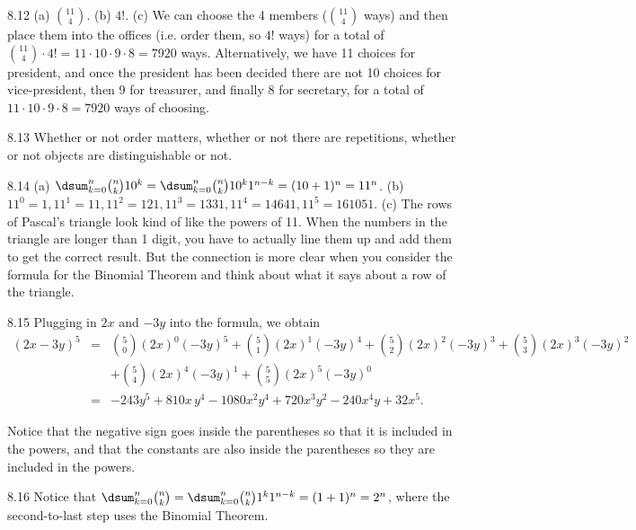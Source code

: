 \begin{RequAnswer}{8.12}
(a) $\binom{11}{4}$.
(b) $4!$.
(c) We can choose the 4 members ($\binom{11}{4}$ ways) and then place them into the offices (i.e. order them, so $4!$ ways)
for a total of $\binom{11}{4}\cdot 4! = 11\cdot 10\cdot 9 \cdot 8 = 7920$ ways.
Alternatively, we have 11 choices for president, and once the president has been decided there are not 10 choices for
vice-president, then 9 for treasurer, and finally 8 for secretary, for a total of  $11\cdot 10\cdot 9 \cdot 8 = 7920$ ways
of choosing.
\end{RequAnswer}
\begin{RequAnswer}{8.13}
Whether or not order matters, whether or not there are repetitions, whether or not objects are distinguishable or not.
\end{RequAnswer}
\begin{RequAnswer}{8.14}
(a) $\dsum_{k=0}^{n} \binom{n}{k}10^{k}= \dsum_{k=0}^{n} \binom{n}{k}10^{k}1^{n-k} = (10+1)^n=11^n$.
(b) $11^0=1, 11^1=11, 11^2=121, 11^3=1331, 11^4=14641, 11^5=161051$.
(c) The rows of Pascal's triangle look kind of like the powers of 11. When the numbers in the triangle are longer than 1 digit,
you have to actually line them up and add them to get the correct result. But the connection is more clear when you
consider the formula for the Binomial Theorem and think about what it says about a row of the triangle.
\end{RequAnswer}
\begin{RequAnswer}{8.15}
Plugging in $2x$ and $-3y$ into the formula, we obtain
\begin{eqnarray*}
(2x-3y)^5 &=&
\binom{5}{0}(2x)^0(-3y)^5+
\binom{5}{1}(2x)^1(-3y)^4+
\binom{5}{2}(2x)^2(-3y)^3+
\binom{5}{3}(2x)^3(-3y)^2\\
&&+\binom{5}{4}(2x)^4(-3y)^1+\binom{5}{5}(2x)^5(-3y)^0\\
&=& -243y^5 + 810x\, y^4 - 1080x^2y^4+720x^3y^2-  240 x^4y+32x^5.
\end{eqnarray*}

\noindent
Notice that the negative sign goes inside the parentheses so that it is included in the powers, and that the constants
are also inside the parentheses so they are included in the powers.
\end{RequAnswer}
\begin{RequAnswer}{8.16}
Notice that $\dsum_{k=0}^{n}\binom{n}{k}= \dsum_{k=0}^{n}\binom{n}{k}1^k1^{n-k}=(1+1)^n=2^n$,
where the second-to-last step uses the Binomial Theorem.
\end{RequAnswer}
